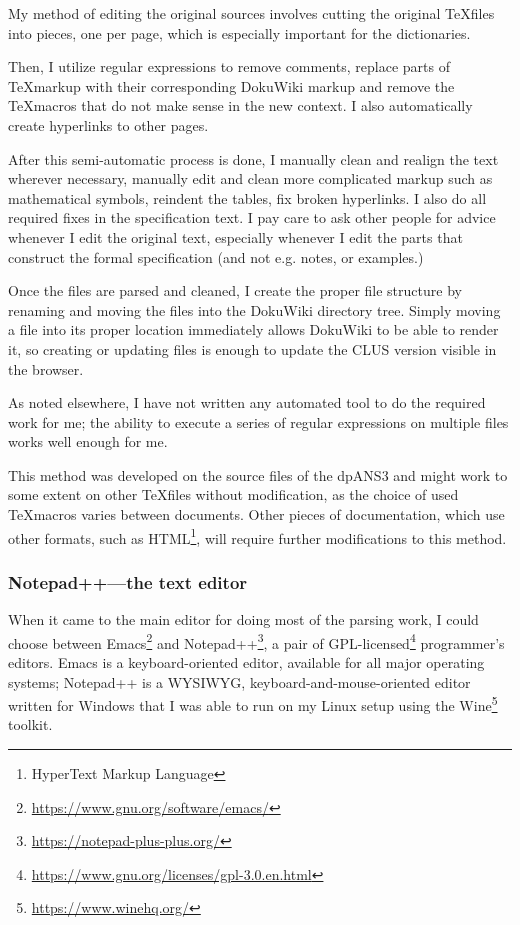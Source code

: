 My method of editing the original sources involves cutting the original \TeX files into pieces, one per page, which is especially important for the dictionaries.

Then, I utilize regular expressions to remove comments, replace parts of \TeX markup with their corresponding Doku\-Wiki markup and remove the \TeX macros that do not make sense in the new context. I also automatically create hyperlinks to other pages.

After this semi-automatic process is done, I manually clean and realign the text wherever necessary, manually edit and clean more complicated markup such as mathematical symbols, reindent the tables, fix broken hyperlinks. I also do all required fixes in the specification text. I pay care to ask other people for advice whenever I edit the original text, especially whenever I edit the parts that construct the formal specification (and not e.g. notes, or examples.)

Once the files are parsed and cleaned, I create the proper file structure by renaming and moving the files into the DokuWiki directory tree. Simply moving a file into its proper location immediately allows DokuWiki to be able to render it, so creating or updating files is enough to update the CLUS version visible in the browser.

As noted elsewhere, I have not written any automated tool to do the required work for me; the ability to execute a series of regular expressions on multiple files works well enough for me.

This method was developed on the source files of the dpANS3 and might work to some extent on other \TeX files without modification, as the choice of used \TeX macros varies between documents. Other pieces of documentation, which use other formats, such as HTML\footnote{HyperText Markup Language}, will require further modifications to this method.

\subsubsection{Notepad++---the text editor}

When it came to the main editor for doing most of the parsing work, I could choose between Emacs\footnote{\url{https://www.gnu.org/software/emacs/}} and Note\-pad++\footnote{\url{https://notepad-plus-plus.org/}}, a pair of GPL-licensed\footnote{\url{https://www.gnu.org/licenses/gpl-3.0.en.html}} programmer's editors. Emacs is a keyboard-oriented editor, available for all major operating systems; Notepad++ is a WYSIWYG, keyboard-and-mouse-oriented editor written for Windows that I was able to run on my Linux setup using the Wine\footnote{\url{https://www.winehq.org/}} toolkit.

